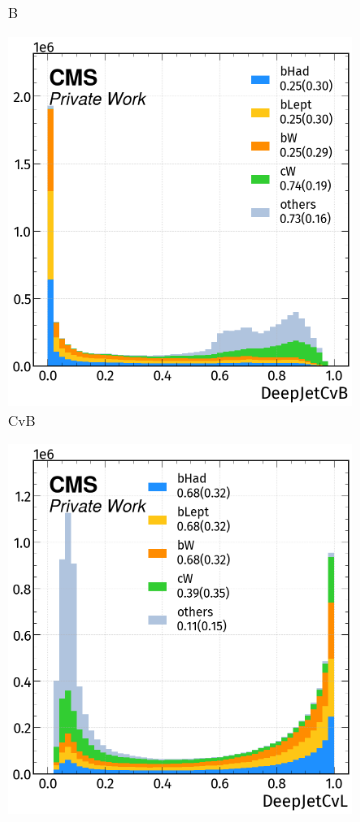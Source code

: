 \begin{figure}[H]
\begin{subfigure}{0.435\linewidth}
        \caption{\DeepJet B}
    \end{subfigure} 
    \hfill
    \begin{subfigure}{0.435\linewidth}
        \centering
        \includegraphics[width=1\linewidth]{fig//chap08-kin_reco/jets/jet_cvb.png}
        \caption{\DeepJet CvB}
    \end{subfigure}
    \hfill
    \begin{subfigure}{0.435\linewidth}  
        \centering
        \includegraphics[width=1\linewidth]{fig//chap08-kin_reco/jets/jet_cvl.png}

\end{subfigure}
\end{figure}
